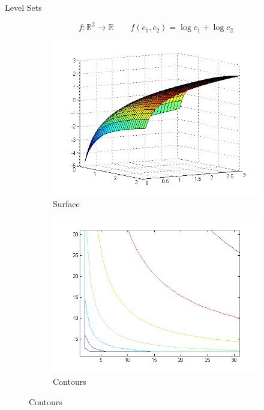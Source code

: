 \documentclass[11pt, xcolor={dvipsnames}, hyperref={colorlinks, allcolors=Blue}]{beamer}
\newcommand{\R}{\mathbb{R}}
\begin{document}
\begin{frame}{Level Sets}
\begin{figure}
\[ f:\R^{2}\rightarrow \R \quad\quad f(c_{1}, c_{2}) = \log c_{1} + \log c_{2}\]
	\begin{subfigure}[b]{0.45\textwidth}
		\centering
		\includegraphics[width=\textwidth]{logconsumption.png}
		\caption{Surface}
	\end{subfigure}
	\begin{subfigure}[b]{0.45\textwidth}
		\centering
		\includegraphics[width=\textwidth]{contour1.png}
		\caption{Contours}
	\end{subfigure}
\end{figure}

\vfill
\end{frame}
\end{document}
